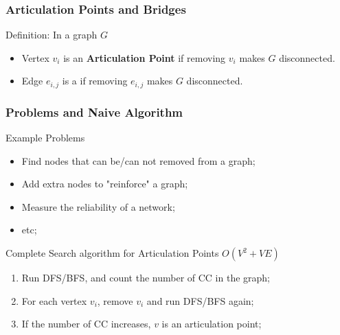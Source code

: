 \begin{frame}
  \frametitle{Articulation Points and Bridges}
    \begin{block}{Definition: In a graph $G$}
      \begin{itemize}
      \item Vertex $v_i$ is an {\bf Articulation Point} if removing $v_i$ makes $G$ disconnected.
      \item Edge $e_{i,j}$ is a  if removing $e_{i,j}$ makes $G$ disconnected.
      \end{itemize}
    \end{block}
    \begin{center}
      \end{center}
\end{frame}

\begin{frame}
  \frametitle{Problems and Naive Algorithm}
  \begin{exampleblock}{Example Problems}
    \begin{itemize}
      \item Find nodes that can be/can not removed from a graph;
      \item Add extra nodes to "reinforce" a graph;
      \item Measure the reliability of a network;
      \item etc;
    \end{itemize}
  \end{exampleblock}\medskip

  \begin{block}{Complete Search algorithm for Articulation Points $O(V^2+VE)$}
  \begin{enumerate}
    \item Run DFS/BFS, and count the number of CC in the graph;
    \item For each vertex $v_i$, remove $v_i$ and run DFS/BFS again;
    \item If the number of CC increases, $v$ is an articulation point;
  \end{enumerate}
  \end{block}
\end{frame}


